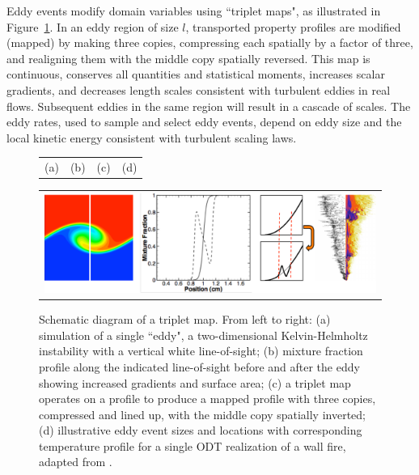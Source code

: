 \documentclass[preprint,12pt, a4paper]{elsarticle}
\begin{document}
Eddy events modify domain variables using ``triplet maps", as illustrated in Figure~\ref{fig:tripletmap}. In an eddy region of size $l$, transported property profiles are modified (mapped) by making three copies, compressing each spatially by a factor of three, and realigning them with the middle copy spatially reversed. This map is continuous, conserves all quantities and statistical moments, increases scalar gradients, and decreases length scales consistent with turbulent eddies in real flows. Subsequent eddies in the same region will result in a cascade of scales. The eddy rates, used to sample and select eddy events, depend on eddy size and the local kinetic energy consistent with turbulent scaling laws.  

\begin{figure}
		\begin{tabular}{llll}
			\hspace{40pt}(a) & \hspace{100pt} (b) & \hspace{70pt} (c) & \hspace{50pt}(d) 
		\end{tabular}
	\begin{center}
		\begin{tabular}{c}
            \includegraphics[width=\textwidth]{fig_tripmap.pdf} 
		\end{tabular}
	\end{center}
    \caption{Schematic diagram of a triplet map. From left to right: (a) simulation of a single ``eddy", a two-dimensional Kelvin-Helmholtz instability with a vertical white line-of-sight; (b) mixture fraction profile along the indicated line-of-sight before and after the eddy showing increased gradients and surface area; (c) a triplet map operates on a profile to produce a mapped profile with three copies, compressed and lined up, with the middle copy spatially inverted; (d) illustrative eddy event sizes and locations with corresponding temperature profile for a single ODT realization of a wall fire, adapted from \cite{Monson_2016}.}
\label{fig:tripletmap}
\end{figure}
\end{document}
